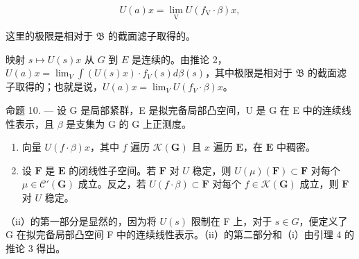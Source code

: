 \[
U (a) x = \lim _ {\mathrm{V}} U (f _ {\mathrm{V}} \cdot \beta) x,
\]

这里的极限是相对于 \(\mathfrak{B}\) 的截面滤子取得的。

映射 \(s \mapsto U(s)x\) 从 \(G\) 到 \(E\) 是连续的。由推论 2，\(U(a)x = \lim_{V} \int (U(s)x) \cdot f_V(s) d\beta(s)\)，其中极限是相对于 \(\mathfrak{B}\) 的截面滤子取得的；也就是说，\(U(a)x = \lim_{V} U(f_V \cdot \beta)x\)。

命题 10. --- 设 G 是局部紧群，E 是拟完备局部凸空间，U 是 G 在 E 中的连续线性表示，且 \(\beta\) 是支集为 G 的 G 上正测度。

\begin{enumerate}
\def\labelenumi{(\roman{enumi})}
\item
  向量 \(U(f \cdot \beta)x\)，其中 \(f\) 遍历 \(\mathcal{K}(\mathbf{G})\) 且 \(x\) 遍历 \(\mathbf{E}\)，在 \(\mathbf{E}\) 中稠密。
\item
  设 \(\mathbf{F}\) 是 \(\mathbf{E}\) 的闭线性子空间。若 \(\mathbf{F}\) 对 \(U\) 稳定，则 \(U(\mu)(\mathbf{F}) \subset \mathbf{F}\) 对每个 \(\mu \in \mathcal{C}'(\mathbf{G})\) 成立。反之，若 \(U(f \cdot \beta) \subset \mathbf{F}\) 对每个 \(f \in \mathcal{K}(\mathbf{G})\) 成立，则 \(\mathbf{F}\) 对 \(U\) 稳定。
\end{enumerate}

（ii）的第一部分是显然的，因为将 \(U(s)\) 限制在 F 上，对于 \(s \in G\)，便定义了 G 在拟完备局部凸空间 F 中的连续线性表示。（ii）的第二部分和（i）由引理 4 的推论 3 得出。

